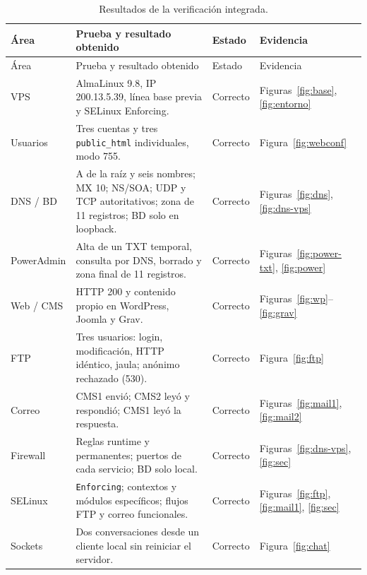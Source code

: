\documentclass[11pt,a4paper]{article}
\begin{document}
\begin{longtable}{@{}p{2.2cm}p{6.2cm}p{1.5cm}p{3.6cm}@{}}
\caption{Resultados de la verificación integrada.}\label{tab:integrada}\\
\toprule Área & Prueba y resultado obtenido & Estado & Evidencia \\\midrule\endfirsthead
\toprule Área & Prueba y resultado obtenido & Estado & Evidencia \\\midrule\endhead
VPS & AlmaLinux 9.8, IP 200.13.5.39, línea base previa y SELinux Enforcing. & Correcto & Figuras~\ref{fig:base}, \ref{fig:entorno} \\
Usuarios & Tres cuentas y tres \texttt{public\_html} individuales, modo 755. & Correcto & Figura~\ref{fig:webconf} \\
DNS / BD & A de la raíz y seis nombres; MX 10; NS/SOA; UDP y TCP autoritativos; zona de 11 registros; BD solo en loopback. & Correcto & Figuras~\ref{fig:dns}, \ref{fig:dns-vps} \\
PowerAdmin & Alta de un TXT temporal, consulta por DNS, borrado y zona final de 11 registros. & Correcto & Figuras~\ref{fig:power-txt}, \ref{fig:power} \\
Web / CMS & HTTP 200 y contenido propio en WordPress, Joomla y Grav. & Correcto & Figuras~\ref{fig:wp}--\ref{fig:grav} \\
FTP & Tres usuarios: login, modificación, HTTP idéntico, jaula; anónimo rechazado (530). & Correcto & Figura~\ref{fig:ftp} \\
Correo & CMS1 envió; CMS2 leyó y respondió; CMS1 leyó la respuesta. & Correcto & Figuras~\ref{fig:mail1}, \ref{fig:mail2} \\
Firewall & Reglas runtime y permanentes; puertos de cada servicio; BD solo local. & Correcto & Figuras~\ref{fig:dns-vps}, \ref{fig:sec} \\
SELinux & \texttt{Enforcing}; contextos y módulos específicos; flujos FTP y correo funcionales. & Correcto & Figuras~\ref{fig:ftp}, \ref{fig:mail1}, \ref{fig:sec} \\
Sockets & Dos conversaciones desde un cliente local sin reiniciar el servidor. & Correcto & Figura~\ref{fig:chat} \\
\bottomrule
\end{longtable}

\end{document}

